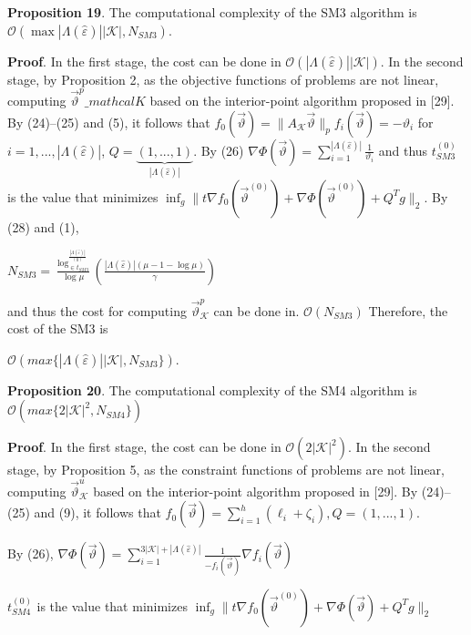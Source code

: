 \documentclass[]{iosart2c}
\begin{document}
\textbf{Proposition 19}. The computational complexity of the
SM3 algorithm is $\mathcal{O}(\max{|\Lambda(\hat{\varepsilon} )| |\mathcal{K}|,N_{SM3}})$.

\textbf{Proof}. In the first stage, the cost can be done in
$\mathcal{O}(|\Lambda(\hat{\varepsilon})| |\mathcal{K}|)$. In the second stage, by Proposition
2, as the objective functions of problems are not
linear, computing $\vec{\vartheta}^p\_mathcal{K}$
based on the interior-point algorithm
proposed in [29]. By (24)–(25) and (5), it
follows that $f_0(\vec{\vartheta}) = \parallel A_\mathcal{K}\vec{\vartheta}\parallel_p f_i(\vec{\vartheta}) = -\vartheta_i$ for $i =
1, ... , |\Lambda(\hat{\varepsilon})|$, $Q = \underbrace{(1, ... , 1)}_{|\Lambda(\hat{\varepsilon})|}$. By (26) $\nabla \Phi \left( \vec{\vartheta} \right) = \sum^{|\Lambda(\hat{\varepsilon})|}_{i=1} \frac{1}{\vartheta_i}$
and thus $t^{(0)}_{SM3}$ is the value that minimizes
$\inf_g \parallel t \nabla f_0 \left( \vec{\vartheta}^{(0)} \right) +\nabla \Phi \left( \vec{\vartheta}^{(0)} \right)+  Q^T g \parallel _2$. By (28)
and (1),

$N_{SM3} = \frac{ \log^{\frac{|\Lambda(\hat{\varepsilon})|}{(0)}}_{\in t_{SM3}}}{\log\mu} \left( \frac{ |\Lambda(\hat{\varepsilon})| (\mu - 1 - \log\mu)}{\gamma} \right)$

and thus the cost for computing $\vec{\vartheta}^p_\mathcal{K}$ can be done
in. $\mathcal{O}(N_{SM3})$ Therefore, the cost of the SM3 is

$\mathcal{O}(max\{|\Lambda(\hat{\varepsilon})| |\mathcal{K}|,N_{SM3}\})$.

\textbf{Proposition 20}. The computational complexity of the
SM4 algorithm is $\mathcal{O}(max\{2|\mathcal{K}|^2,N_{SM4}\})$

\textbf{Proof}. In the first stage, the cost can be done in
$\mathcal{O}(2 |\mathcal{K}|^2)$. In the second stage, by Proposition 5, as
the constraint functions of problems are not linear,
computing $\vec{\vartheta}^u_\mathcal{K}$
based on the interior-point algorithm
proposed in [29]. By (24)–(25) and (9), it follows that
$f_0\left(\vec{\vartheta}\right) = \sum^h_{i=1}(\ell_i + \zeta_i),Q = (1, ... , 1)$. 

By (26), $\nabla \Phi \left( \vec{\vartheta} \right) = \sum^{3|\mathcal{K}|+|\Lambda(\hat{\varepsilon})|}_{i=1} \frac{1}{-f_i\left(\vec{\vartheta}\right)} \nabla f_i \left( \vec{\vartheta} \right)$

$t^{(0)}_{SM4}$ is the value that minimizes
$\inf_g \parallel t\nabla f_0 \left( \vec{\vartheta}^(0) \right) + \nabla \Phi \left( \vec{\vartheta} \right) + Q^T g \parallel_2$
\end{document}
